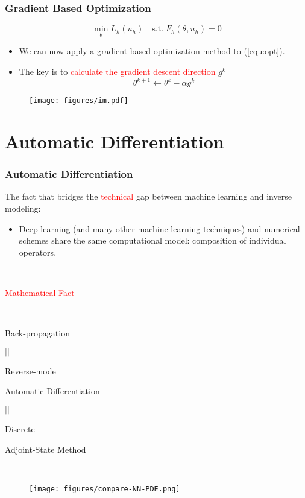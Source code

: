 \documentclass[usenames,dvipsnames]{beamer}
\begin{document}
\begin{frame}
	\frametitle{Gradient Based Optimization}
	\begin{equation}\label{equ:opt}
		\min_{\theta} L_h(u_h) \quad \mathrm{s.t.}\; F_h(\theta, u_h) = 0
		\end{equation}
	
	\begin{itemize}
		\item We can now apply a gradient-based optimization method to (\ref{equ:opt}).
		\item The key is to \textcolor{red}{calculate the gradient descent direction} $g^k$
		$$\theta^{k+1} \gets \theta^k - \alpha g^k$$ 
	\end{itemize}
	
	\begin{figure}[hbt]
	\centering
  \texttt{[image: figures/im.pdf]}
\end{figure}

\end{frame}



\section{Automatic Differentiation}


\begin{frame}
	\frametitle{Automatic Differentiation}
	The fact that bridges the \textcolor{red}{technical} gap between machine learning and inverse modeling:
	\begin{itemize}
		\item Deep learning (and many other machine learning techniques) and numerical schemes share the same computational model: composition of individual operators. 
	\end{itemize}
	
	
	\begin{minipage}[t]{0.4\textwidth}
		
		\
		
		
		
		\begin{center}
			\textcolor{red}{Mathematical Fact}
			
			\
			
			Back-propagation 
			
			$||$
			
			Reverse-mode
			
			Automatic Differentiation 
			
			$||$
			
			Discrete 
			
			Adjoint-State Method
		\end{center}
	\end{minipage}~
	\begin{minipage}[t]{0.6\textwidth}
		\begin{figure}[hbt]
			\texttt{[image: figures/compare-NN-PDE.png]}
		\end{figure}
	\end{minipage}
	
\end{frame}
\end{document}

